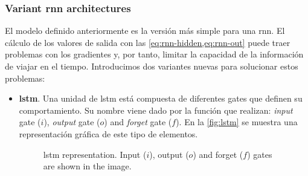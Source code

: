 \subsubsection{Variant \gls*{rnn} architectures}
El modelo definido anteriormente es la versión más simple para una
\gls{rnn}. El cálculo de los valores de salida con las
\vref{eq:rnn-hidden,eq:rnn-out} puede traer problemas con los gradientes y, por
tanto, limitar la capacidad de la información de viajar en el
tiempo. Introducimos dos variantes nuevas para solucionar estos
problemas:
\begin{itemize}
  \item \textbf{\gls*{lstm}}. Una unidad de \gls{lstm} está compuesta de
  diferentes gates que definen su comportamiento. Su nombre viene dado por la
  función que realizan: \emph{input} gate (\(i\)), \emph{output} gate (\(o\))
  and \emph{forget} gate (\(f\)). En la \vref{fig:lstm} se muestra una
  representación gráfica de este tipo de elementos.
  \begin{figure}[ht]
    \centering
    
    \caption[\acl*{lstm}]{\acf{lstm} representation. Input (\(i\)), output
      (\(o\)) and forget (\(f\)) gates are shown in the image.}
    \label{fig:lstm}
  \end{figure}


\end{itemize}
